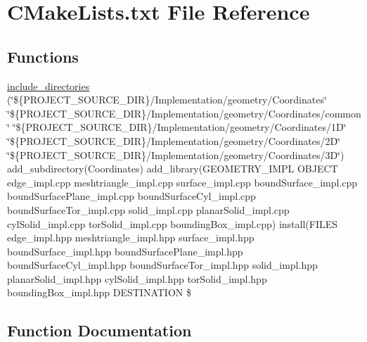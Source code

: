 \hypertarget{Implementation_2geometry_2CMakeLists_8txt}{}\section{C\+Make\+Lists.\+txt File Reference}
\label{Implementation_2geometry_2CMakeLists_8txt}
\subsection*{Functions}
\begin{DoxyCompactItemize}
\item 
\hyperlink{Implementation_2geometry_2CMakeLists_8txt_a57d585be535eab7945e2bc0c2e9b7b57}{include\+\_\+directories} (\char`\"{}\$\{P\+R\+O\+J\+E\+C\+T\+\_\+\+S\+O\+U\+R\+C\+E\+\_\+\+D\+IR\}/Implementation/geometry/Coordinates\char`\"{} \char`\"{}\$\{P\+R\+O\+J\+E\+C\+T\+\_\+\+S\+O\+U\+R\+C\+E\+\_\+\+D\+IR\}/Implementation/geometry/Coordinates/common\char`\"{} \char`\"{}\$\{P\+R\+O\+J\+E\+C\+T\+\_\+\+S\+O\+U\+R\+C\+E\+\_\+\+D\+IR\}/Implementation/geometry/Coordinates/1\+D\char`\"{} \char`\"{}\$\{\+P\+R\+O\+J\+E\+C\+T\+\_\+\+S\+O\+U\+R\+C\+E\+\_\+\+D\+I\+R\}/\+Implementation/geometry/\+Coordinates/2\+D\char`\"{} \char`\"{}\$\{\+P\+R\+O\+J\+E\+C\+T\+\_\+\+S\+O\+U\+R\+C\+E\+\_\+\+D\+I\+R\}/\+Implementation/geometry/\+Coordinates/3\+D\char`\"{}) add\+\_\+subdirectory(\+Coordinates) add\+\_\+library(\+G\+E\+O\+M\+E\+T\+R\+Y\+\_\+\+I\+M\+P\+L O\+B\+J\+E\+C\+T edge\+\_\+impl.\+cpp meshtriangle\+\_\+impl.\+cpp surface\+\_\+impl.\+cpp bound\+Surface\+\_\+impl.\+cpp bound\+Surface\+Plane\+\_\+impl.\+cpp bound\+Surface\+Cyl\+\_\+impl.\+cpp bound\+Surface\+Tor\+\_\+impl.\+cpp solid\+\_\+impl.\+cpp planar\+Solid\+\_\+impl.\+cpp cyl\+Solid\+\_\+impl.\+cpp tor\+Solid\+\_\+impl.\+cpp bounding\+Box\+\_\+impl.\+cpp) install(\+F\+I\+L\+E\+S edge\+\_\+impl.\+hpp meshtriangle\+\_\+impl.\+hpp surface\+\_\+impl.\+hpp bound\+Surface\+\_\+impl.\+hpp bound\+Surface\+Plane\+\_\+impl.\+hpp bound\+Surface\+Cyl\+\_\+impl.\+hpp bound\+Surface\+Tor\+\_\+impl.\+hpp solid\+\_\+impl.\+hpp planar\+Solid\+\_\+impl.\+hpp cyl\+Solid\+\_\+impl.\+hpp tor\+Solid\+\_\+impl.\+hpp bounding\+Box\+\_\+impl.\+hpp D\+E\+S\+T\+I\+N\+A\+T\+I\+O\+N \$
\end{DoxyCompactItemize}


\subsection{Function Documentation}
\mbox{\label{Implementation_2geometry_2CMakeLists_8txt_a57d585be535eab7945e2bc0c2e9b7b57}} 
